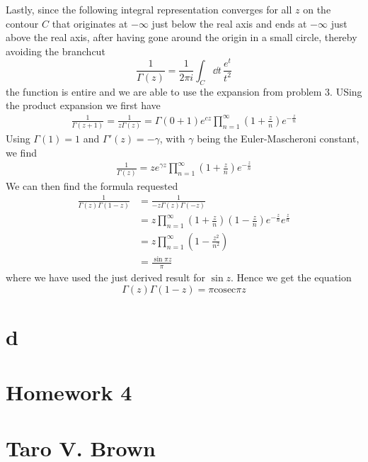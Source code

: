 \documentclass[a4paper,12pt]{article}
\begin{document}
Lastly, since the following integral representation converges for all $z$ on the contour $C$ that originates at $-\infty$ just below the real axis and ends at $-\infty$ just above the real axis, after having gone around the origin in a small circle, thereby avoiding the branchcut
\begin{equation}
\frac{1}{\Gamma(z)}=\frac{1}{2\pi i}\int_C\dd t\, \frac{e^t}{t^2}
\end{equation}
the function is entire and we are able to use the expansion from problem 3. USing the product expansion we first have
\begin{equation}
\begin{aligned}
\frac{1}{\Gamma(z+1)}=\frac{1}{z\Gamma(z)}=\Gamma(0+1)e^{cz}\prod_{n=1}^{\infty}\left(1+\frac{z}{n}\right)e^{-\frac{z}{n}}
\end{aligned}
\end{equation}
Using $\Gamma(1)=1$ and $\Gamma'(z)=-\gamma$, with $\gamma $ being the Euler-Mascheroni constant, we find
\begin{equation}
	\begin{aligned}
\frac{1}{\Gamma(z)}=ze^{\gamma z}\prod_{n=1}^{\infty}\left(1+\frac{z}{n}\right)e^{-\frac{z}{n}}
	\end{aligned}
\end{equation}
We can then find the formula requested
\begin{equation}
\begin{aligned}
\frac{1}{\Gamma(z)\Gamma(1-z)}&=
\frac{1}{-z\Gamma(z)\Gamma(-z)}\\
&=z\prod_{n=1}^{\infty}\left(1+\frac{z}{n}\right)\left(1-\frac{z}{n}\right)e^{-\frac{z}{n}}e^{\frac{z}{n}}\\
&=z\prod_{n=1}^{\infty}\left(1-\frac{z^2}{n^2}\right)\\
&=\frac{\sin \pi z}{\pi}
\end{aligned}
\end{equation}
where we have used the just derived result for $\sin z$. Hence we get the equation
\begin{equation}
\Gamma(z)\Gamma(1-z)=\pi\text{cosec} \pi z
\end{equation}
\section{d}
\newpage
\section*{Homework 4\\\\
	Taro V. Brown}\vspace*{1cm}
\end{document}
